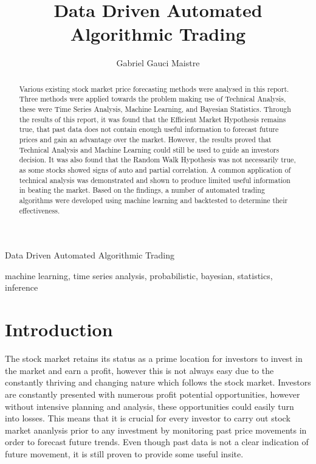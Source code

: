 \documentclass[times]{jtitauth}
\begin{document}
\title{Data Driven Automated Algorithmic Trading}

\author{Gabriel Gauci Maistre}

{Data Driven Automated Algorithmic Trading}

\maketitle

\begin{abstract}
Various existing stock market price forecasting methods were analysed in this report. Three methods were applied towards the problem making use of Technical Analysis, these were Time Series Analysis, Machine Learning, and Bayesian Statistics. Through the results of this report, it was found that the Efficient Market Hypothesis remains true, that past data does not contain enough useful information to forecast future prices and gain an advantage over the market. However, the results proved that Technical Analysis and Machine Learning could still be used to guide an investors decision. It was also found that the Random Walk Hypothesis was not necessarily true, as some stocks showed signs of auto and partial correlation. A common application of technical analysis was demonstrated and shown to produce limited useful information in beating the market. Based on the findings, a number of automated trading algorithms were developed using machine learning and backtested to determine their effectiveness.
\end {abstract}

\begin{keywords}
machine learning, time series analysis,
probabilistic, bayesian, statistics,
inference\
\end{keywords}

\section{Introduction}

The stock market retains its status as a prime location for investors to invest in the market and earn a profit, however this is not always easy due to the constantly thriving and changing nature which follows the stock market. Investors are constantly presented with numerous profit potential opportunities, however without intensive planning and analysis, these opportunities could easily turn into losses. This means that it is crucial for every investor to carry out stock market ananlysis prior to any investment by monitoring past price movements in order to forecast future trends. Even though past data is not a clear indication of future movement, it is still proven to provide some useful insite.
\end{document}
